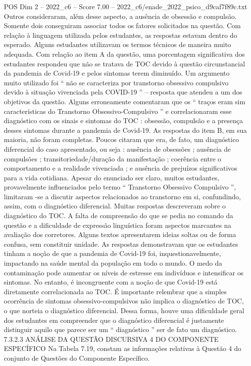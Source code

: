 \begin{textsample}{POS Dim 2 – 2022\_c6 – Score 7.00 – 2022\_c6/enade\_2022\_psico\_d9caf7f89c.txt}
Outros consideraram, além desse aspecto, a ausência de obsessão e compulsão.
Somente dois conseguiram associar todos os fatores solicitados na questão.
Com relação à linguagem utilizada pelos estudantes, as respostas estavam dentro do esperado.
Alguns estudantes utilizavam os termos técnicos de maneira muito adequada.
Com relação ao item A da questão, uma porcentagem significativa dos estudantes respondeu que não se tratava de TOC devido à questão circunstancial da pandemia de Covid-19 e pelos sintomas terem diminuído.
Um argumento muito utilizado foi “ não se caracteriza por transtorno obsessivo compulsivo devido à situação vivenciada pela COVID-19 ” – resposta que atendeu a um dos objetivos da questão.
Alguns erroneamente comentaram que os “ traços eram sim características do Transtorno Obsessivo-Compulsivo ” e correlacionaram esse diagnóstico com os sinais e sintomas do TOC : obsessão, compulsão e a presença desses sintomas durante a pandemia de Covid-19.
As respostas do item B, em sua maioria, não foram completas.
Poucos citaram que era, de fato, um diagnóstico diferencial do caso apresentado, ou seja : ausência de obsessões ; ausência de compulsões ; transitoriedade/duração da manifestação ; coerência entre o comportamento e a realidade vivenciada ; e ausência de prejuízos significativos para a vida cotidiana.
Apesar do enunciado ser claro, muitos estudantes, provavelmente influenciados pelo termo “ Transtorno Obsessivo Compulsivo ”, limitaram -se a discutir aspectos relacionados ao transtorno em si, confundindo, assim, com o diagnóstico diferencial.
Muitas respostas descreveram sobre o diagnóstico do TOC.
A falta de compreensão do que se pedia no comando da questão e a dificuldade de expressão linguística foram aspectos marcantes na avaliação dos corretores.
Alguns textos apresentarem ideias soltas ou de forma confusa, sem constituir unidade.
As respostas demonstravam que os estudantes tinham a noção de que a pandemia de Covid-19 foi, inquestionavelmente, impactando na saúde mental da população em todo o mundo.
O medo da contaminação pode aumentar os níveis de estresse em indivíduos e intensificar os sintomas.
No entanto, é incongruente com a noção de que Covid-19 está diretamente correlacionada ao TOC.
É importante relembrar que a simples ocorrência de sintomas obsessivo-compulsivos não implica o diagnóstico de TOC, o que norteia o diagnóstico diferencial.
Dessa forma, houve uma dificuldade geral dos estudantes em compreender que o diagnóstico diferencial é justamente distinguir aquilo que parece ser um “ diagnóstico ” ser de fato um diagnóstico. 7.3.2.3 ANÁLISE DA QUESTÃO DISCURSIVA 4 DO COMPONENTE ESPECÍFICO Na Tabela 7.19, constam as informações relativas à Questão 4 do conjunto de Questões do Componente Específico.

\end{textsample}

